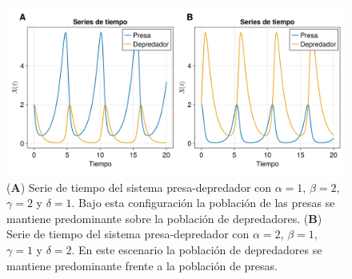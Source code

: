 

\begin{figure}[h!]
	\centering
	\includegraphics[scale=0.23]{../Imagenes/Series de Tiempo PD}
	\caption{(\textbf{A}) Serie de tiempo del sistema presa-depredador con $\alpha=1$, $\beta=2$, $\gamma=2$ y $\delta=1$. Bajo esta configuración la población de las presas se mantiene predominante sobre la población de depredadores. (\textbf{B}) Serie de tiempo del sistema presa-depredador con $\alpha=2$, $\beta = 1$, $\gamma = 1$ y $\delta = 2$. En este escenario la población de depredadores se mantiene predominante frente a la población de presas.}
	\label{fig:SeriesdeTiempoPD}
\end{figure}

